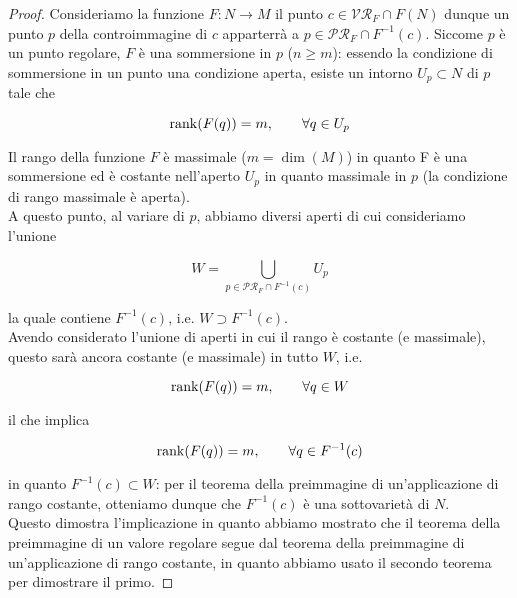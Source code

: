 \begin{proof}
	Consideriamo la funzione $ F : N \to M $ il punto $ c \in \mathcal{VR}_{F} \cap F(N) $ dunque un punto $ p $ della controimmagine di $ c $ apparterrà a $ p \in \mathcal{PR}_{F} \cap F^{-1}(c) $. Siccome $ p $ è un punto regolare, $ F $ è una sommersione in $ p $ ($ n \geqslant m $): essendo la condizione di sommersione in un punto una condizione aperta, esiste un intorno $ U_{p} \subset N $ di $ p $ tale che
	
	\begin{equation}
		\rank(F(q)) = m, \qquad \forall q \in U_{p}
	\end{equation}
	
	Il rango della funzione $ F $ è massimale ($ m = \dim(M) $) in quanto F è una sommersione ed è costante nell'aperto $ U_{p} $ in quanto massimale in $ p $ (la condizione di rango massimale è aperta).\\
	A questo punto, al variare di $ p $, abbiamo diversi aperti di cui consideriamo l'unione
	
	\begin{equation}
		W = \bigcup_{p \in \mathcal{PR}_{F} \cap F^{-1}(c)} U_{p}
	\end{equation}
	
	la quale contiene $ F^{-1}(c) $, i.e. $ W \supset F^{-1}(c) $.\\
	Avendo considerato l'unione di aperti in cui il rango è costante (e massimale), questo sarà ancora costante (e massimale) in tutto $ W $, i.e.
	
	\begin{equation}
		\rank(F(q)) = m, \qquad \forall q \in W
	\end{equation}

	il che implica
	
	\begin{equation}
		\rank(F(q)) = m, \qquad \forall q \in F^{-1}(c)
	\end{equation}
	
	in quanto $ F^{-1}(c) \subset W $: per il teorema della preimmagine di un'applicazione di rango costante, otteniamo dunque che $ F^{-1}(c) $ è una sottovarietà di $ N $.\\	
	Questo dimostra l'implicazione in quanto abbiamo mostrato che il teorema della preimmagine di un valore regolare segue dal teorema della preimmagine di un'applicazione di rango costante, in quanto abbiamo usato il secondo teorema per dimostrare il primo.
\end{proof}

